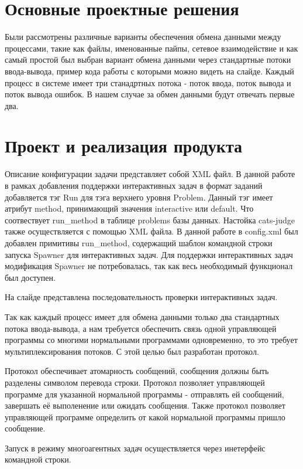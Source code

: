 \documentclass[a4paper,14pt]{extarticle}
\begin{document}
\section{Основные проектные решения}

Были рассмотрены различные варианты обеспечения обмена данными между процессами, такие как файлы, именованные пайпы, сетевое взаимодействие и как самый простой был выбран вариант обмена данными через стандартные потоки ввода-вывода, пример кода работы с которыми можно видеть на слайде. Каждый процесс в системе имеет три станадртных потока - поток ввода, поток вывода и поток вывода ошибок. В нашем случае за обмен данными будут отвечать первые два.

\section{Проект и реализация продукта}

Описание конфигурации задачи представляет собой XML файл. В данной работе в рамках добавления поддержки интерактивных задач в формат заданий добавляется тэг Run для тэга верхнего уровня Problem. Данный тэг имеет атрибут method, принимающий значения interactive или default. Что соотвествует run\_method в таблице problems базы данных. Настойка cats-judge также осуществляется с помощью XML файла. В данной работе в config.xml был добавлен примитивы run\_method, содержащий шаблон командной строки запуска Spawner для интерактивных задач. Для поддержки интерактивных задач модификация Spawner не потребовалась, так как весь необходимый функционал был доступен.

На слайде представлена последовательность проверки интерактивных задач.

Так как каждый процесс имеет для обмена данными только два стандартных потока ввода-вывода, а нам требуется обеспечить связь одной управляющей программы со многими нормальными программами одновременно, то это требует мультиплексирования потоков. С этой целью был разработан протокол.

Протокол обеспечивает атомарность сообщений, сообщения должны быть разделены символом перевода строки. Протокол позволяет управляющей программе для указанной нормальной программы - отправлять ей сообщений, завершать её выполенение или ожидать сообщения. Также протокол позволяет управляющей программе определить от какой нормальной программы пришло сообщение.

Запуск в режиму многоагентных задач осуществляется через инетерфейс командной строки.
\end{document}
